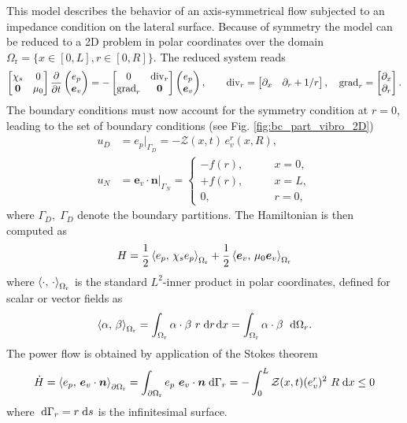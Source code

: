  This model describes the behavior of an axis-symmetrical flow subjected to an impedance condition on the lateral surface. Because of symmetry the model can be reduced to a 2D problem in polar coordinates over the domain $\Omega_{\text{r}} = \{x \in [0, L], r \in [0, R]\}$. The reduced system reads
\begin{equation}
\label{eq:red_mod}
\begin{bmatrix}
\chi_s & 0 \\
\bm{0} & \mu_0  \\
\end{bmatrix}
\diffp{}{t}
\begin{pmatrix}
e_p \\
\bm{e}_v \\
\end{pmatrix} = -
\begin{bmatrix}
0 & \div_r \\
{\grad}_r & \bm{0} \\
\end{bmatrix}
\begin{pmatrix}
e_p \\
\bm{e}_v \\
\end{pmatrix}, \qquad
{\div}_r = \begin{bmatrix}
\partial_x & \partial_r + 1/r
\end{bmatrix}, \quad
{\grad}_r = \begin{bmatrix}
\partial_x\\
\partial_r\\
\end{bmatrix}.
\end{equation}
The boundary conditions must now account for the symmetry condition at $r=0$, leading to the set of boundary conditions (see Fig. \ref{fig:bc_part_vibro_2D})
\begin{align}
u_D &=  e_p|_{\Gamma_D} = - \mathcal{Z}(x, t) \, e_v^r(x, R), \label{eq:bc_imp} \\
u_N &= \bm{e}_v \cdot \bm{n}|_{\Gamma_N} = 
\begin{cases}
- f(r), \qquad &x=0, \\
+ f(r), \qquad &x=L, \\
0, \qquad &r=0,
\end{cases} \label{eq:bc_neu}
\end{align}
where $\Gamma_D, \; \Gamma_D$ denote the boundary partitions.
 The Hamiltonian is then computed as
\[
H = \frac{1}{2} \inner[\Omega_{\text{r}}]{e_p}{\chi_s e_p} + \frac{1}{2} \inner[\Omega_{\text{r}}]{\bm{e}_v}{\mu_0 \bm{e}_v}
\]
where $\inner[\Omega_{\text{r}}]{\cdot}{\cdot}$ is the standard $L^2$-inner product in polar coordinates, defined for scalar or vector fields as
\[
\inner[\Omega_{\text{r}}]{\alpha}{\beta}= \int_{\Omega_{\text{r}}} \alpha \cdot \beta \ r \d{r} \d{x} = \int_{\Omega_{\text{r}}} \alpha \cdot \beta \ \d{\Omega_r}.
\]
The power flow is obtained by application of the Stokes theorem
\[
\dot{H} = \inner[\partial \Omega_{\text{r}}]{e_p}{\bm{e}_v \cdot \bm{n}} = \int_{\partial \Omega_{\text{r}}} e_p \ \bm{e}_v \cdot \bm{n} \d{\Gamma_r} = - \int_{0}^{L} \mathcal{Z}(x, t) (e_v^r)^2 \ R \d{x} \le 0 
\]
where $\d{\Gamma_r} = r \d{s}$ is the infinitesimal surface. \\

